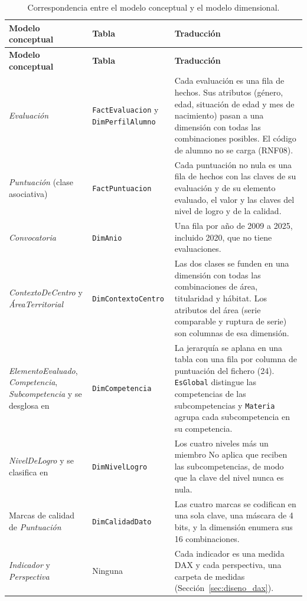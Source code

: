 \documentclass[12pt, a4paper, oneside]{report}
\begin{document}
{\small{}\renewcommand{\arraystretch}{1.1}
\begin{longtable}{@{} >{\raggedright\arraybackslash}p{3.5cm} >{\raggedright\arraybackslash}p{3.6cm} p{7.2cm} @{}}
\toprule
\textbf{Modelo conceptual} & \textbf{Tabla} & \textbf{Traducción} \\ \midrule
\endfirsthead
\toprule
\textbf{Modelo conceptual} & \textbf{Tabla} & \textbf{Traducción} \\ \midrule
\endhead
\bottomrule
\caption{Correspondencia entre el modelo conceptual y el modelo dimensional.}\label{tab:correspondencia}
\endlastfoot
\textit{Evaluación} & \texttt{FactEvaluacion} y \texttt{DimPerfilAlumno} & Cada evaluación es una fila de hechos. Sus atributos (género, edad, situación de edad y mes de nacimiento) pasan a una dimensión con todas las combinaciones posibles. El código de alumno no se carga (RNF08). \\ \addlinespace
\textit{Puntuación} (clase asociativa) & \texttt{FactPuntuacion} & Cada puntuación no nula es una fila de hechos con las claves de su evaluación y de su elemento evaluado, el valor y las claves del nivel de logro y de la calidad. \\ \addlinespace
\textit{Convocatoria} & \texttt{DimAnio} & Una fila por año de 2009 a 2025, incluido 2020, que no tiene evaluaciones. \\ \addlinespace
\textit{ContextoDeCentro} y \textit{ÁreaTerritorial} & \texttt{DimContextoCentro} & Las dos clases se funden en una dimensión con todas las combinaciones de área, titularidad y hábitat. Los atributos del área (serie comparable y ruptura de serie) son columnas de esa dimensión. \\ \addlinespace
\textit{ElementoEvaluado}, \textit{Competencia}, \textit{Subcompetencia} y \guillemotleft{}se desglosa en\guillemotright{} & \texttt{DimCompetencia} & La jerarquía se aplana en una tabla con una fila por columna de puntuación del fichero (24). \texttt{EsGlobal} distingue las competencias de las subcompetencias y \texttt{Materia} agrupa cada subcompetencia en su competencia. \\ \addlinespace
\textit{NivelDeLogro} y \guillemotleft{}se clasifica en\guillemotright{} & \texttt{DimNivelLogro} & Los cuatro niveles más un miembro \guillemotleft{}No aplica\guillemotright{} que reciben las subcompetencias, de modo que la clave del nivel nunca es nula. \\ \addlinespace
Marcas de calidad de \textit{Puntuación} & \texttt{DimCalidadDato} & Las cuatro marcas se codifican en una sola clave, una máscara de 4 bits, y la dimensión enumera sus 16 combinaciones. \\ \addlinespace
\textit{Indicador} y \textit{Perspectiva} & Ninguna & Cada indicador es una medida DAX y cada perspectiva, una carpeta de medidas (Sección~\ref{sec:diseno_dax}). \\
\end{longtable}}
\end{document}
